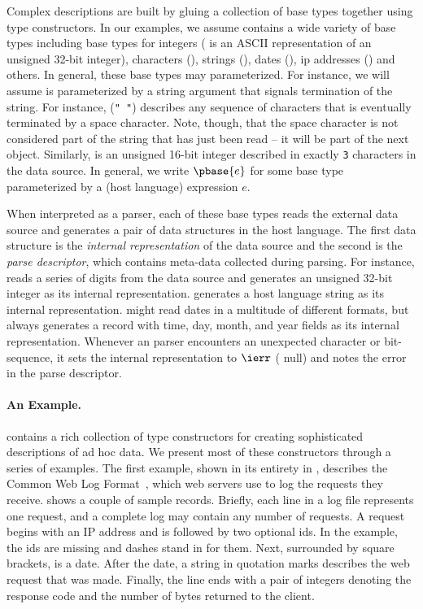 Complex \ipads{} descriptions are built by gluing a collection of base
types together using \ipads{} type constructors.  In our examples, we
assume \ipads{} contains a wide variety of base types including base
types for integers (\Puint{} is an ASCII representation of an unsigned
32-bit integer), characters (\Pchar), strings (\Pstring), dates
(\Pdate), ip addresses (\Pip) and others.  In general, these base
types may parameterized.  For instance, we will assume \Pstring{} is
parameterized by a string argument that signals termination of the
string.  For instance, \Pstring({\tt " "}) describes any sequence of
characters that is eventually terminated by a space character. Note,
though, that the space character is not considered part of the string
that has just been read -- it will be part of the next object.
Similarly,  is an unsigned 16-bit
integer described in exactly {\tt 3} characters in the data source.
In general, we write $\pbase{e}$ for some base type parameterized by a
(host language) expression $e$.

When interpreted as a parser, each of these base types reads
the external data source and generates a pair of data structures
in the host language.  The first data structure is the
{\em internal representation} of the data source and
the second is the {\em parse descriptor}, which contains meta-data collected during parsing.
For instance, \Puint{} reads a series of digits from the
data source and generates an unsigned 32-bit integer as its
internal representation.  \Pstring{} generates a 
host language string as its internal representation.  
\Pdate{} might read dates in a multitude of
different formats, but always generates a record
with time, day, month, and year fields as its internal 
representation.  Whenever an \ipads{} parser encounters
an unexpected character or bit-sequence, it sets the internal representation to
$\ierr$ (\ie{} null) and notes the error in the
parse descriptor.

\paragraph*{An \ipads{} Example.}
\ipads{} contains a rich collection of type constructors for creating
sophisticated descriptions of ad hoc data.  We present most of these
constructors through a series of examples.  The first example, shown
in its entirety in , describes the Common Web
Log Format~\cite{wpp}, which web servers use to log the requests they
receive.   shows a couple of sample
records.  Briefly, each line in a log file represents one request, and
a complete log may contain any number of requests.  A request begins
with an IP address and is followed by two optional ids.  In the
example, the ids are missing and dashes stand in for them.  Next,
surrounded by square brackets, is a date.  After the date, a string in
quotation marks describes the web request that was made.  Finally, the
line ends with a pair of integers denoting the response code and the
number of bytes returned to the client.


